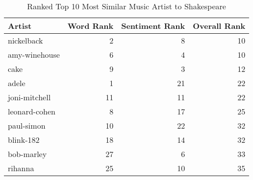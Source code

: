 \begin{table}[ht]
\centering
\begin{tabular}{lrrr}
  \hline
Artist & Word Rank & Sentiment Rank & Overall Rank \\ 
  \hline
nickelback &   2 &   8 &  10 \\ 
  amy-winehouse &   6 &   4 &  10 \\ 
  cake &   9 &   3 &  12 \\ 
  adele &   1 &  21 &  22 \\ 
  joni-mitchell &  11 &  11 &  22 \\ 
  leonard-cohen &   8 &  17 &  25 \\ 
  paul-simon &  10 &  22 &  32 \\ 
  blink-182 &  18 &  14 &  32 \\ 
  bob-marley &  27 &   6 &  33 \\ 
  rihanna &  25 &  10 &  35 \\ 
   \hline
\end{tabular}
\caption{Ranked Top 10 Most Similar Music Artist to Shakespeare} 
\label{tab:overallranktable}
\end{table}

